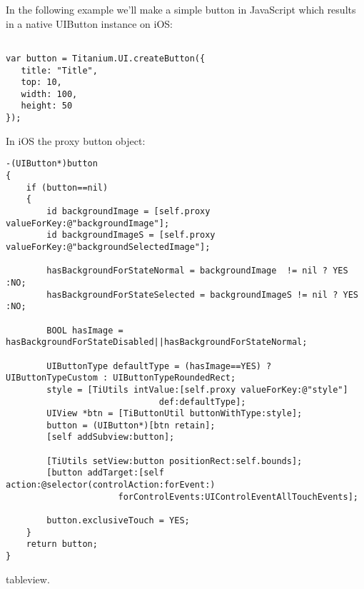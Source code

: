 In the following example we'll make a simple button in JavaScript which results in a native UIButton instance on iOS:

\begin{verbatim}

var button = Titanium.UI.createButton({
   title: "Title",
   top: 10,
   width: 100,
   height: 50
});
\end{verbatim}

In iOS the proxy button object:
\begin{verbatim}
-(UIButton*)button
{
	if (button==nil)
	{
		id backgroundImage = [self.proxy valueForKey:@"backgroundImage"];
		id backgroundImageS = [self.proxy valueForKey:@"backgroundSelectedImage"];

		hasBackgroundForStateNormal = backgroundImage  != nil ? YES :NO;
		hasBackgroundForStateSelected = backgroundImageS != nil ? YES :NO;

		BOOL hasImage = hasBackgroundForStateDisabled||hasBackgroundForStateNormal;

		UIButtonType defaultType = (hasImage==YES) ? UIButtonTypeCustom : UIButtonTypeRoundedRect;
		style = [TiUtils intValue:[self.proxy valueForKey:@"style"]
							  def:defaultType];
		UIView *btn = [TiButtonUtil buttonWithType:style];
		button = (UIButton*)[btn retain];
		[self addSubview:button];

		[TiUtils setView:button positionRect:self.bounds];
		[button addTarget:[self action:@selector(controlAction:forEvent:) 
					  forControlEvents:UIControlEventAllTouchEvents];

		button.exclusiveTouch = YES;
	}
	return button;
}
\end{verbatim}




tableview.